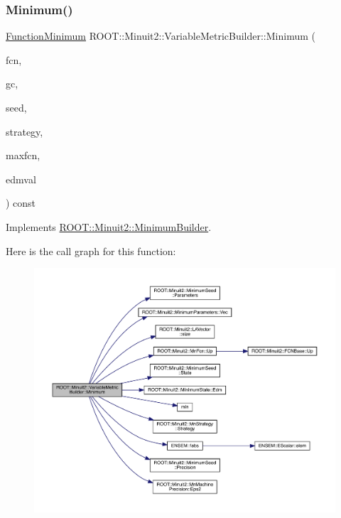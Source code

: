 \subsubsection{\texorpdfstring{Minimum()}{Minimum()}\hspace{0.1cm}{\footnotesize\ttfamily [2/4]}}
{\footnotesize\ttfamily \mbox{\hyperlink{classROOT_1_1Minuit2_1_1FunctionMinimum}{Function\+Minimum}} R\+O\+O\+T\+::\+Minuit2\+::\+Variable\+Metric\+Builder\+::\+Minimum (\begin{DoxyParamCaption}\item[{const \mbox{\hyperlink{classROOT_1_1Minuit2_1_1MnFcn}{Mn\+Fcn}} \&}]{fcn,  }\item[{const \mbox{\hyperlink{classROOT_1_1Minuit2_1_1GradientCalculator}{Gradient\+Calculator}} \&}]{gc,  }\item[{const \mbox{\hyperlink{classROOT_1_1Minuit2_1_1MinimumSeed}{Minimum\+Seed}} \&}]{seed,  }\item[{const \mbox{\hyperlink{classROOT_1_1Minuit2_1_1MnStrategy}{Mn\+Strategy}} \&}]{strategy,  }\item[{unsigned int}]{maxfcn,  }\item[{double}]{edmval }\end{DoxyParamCaption}) const\hspace{0.3cm}{\ttfamily [virtual]}}



Implements \mbox{\hyperlink{classROOT_1_1Minuit2_1_1MinimumBuilder_aefaa624436afa8195af1f3393a35981f}{R\+O\+O\+T\+::\+Minuit2\+::\+Minimum\+Builder}}.

Here is the call graph for this function\+:\nopagebreak
\begin{figure}[H]
\begin{center}
\leavevmode
\includegraphics[width=350pt]{d5/d52/classROOT_1_1Minuit2_1_1VariableMetricBuilder_a56d18a37b8643611ff80875b91915784_cgraph}
\end{center}
\end{figure}
\mbox{\label{classROOT_1_1Minuit2_1_1VariableMetricBuilder_a6214271e1802f110e94725295f3900fc}} 
